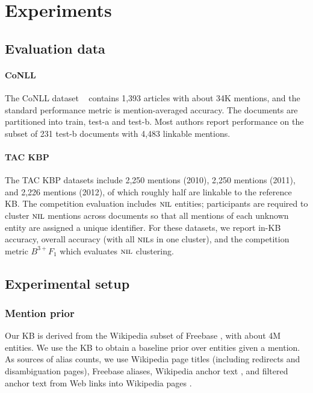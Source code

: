 \section{Experiments}
\label{sec:expt}

\subsection{Evaluation data}

\paragraph{CoNLL} 
The CoNLL dataset ~\cite{Hoffart2011} contains 1,393 articles with
about 34K mentions, and the standard performance metric is
mention-averaged accuracy.  The documents are partitioned into train,
test-a and test-b.  Most authors report performance on the subset of
231 test-b documents with 4,483 linkable mentions.

\paragraph{TAC KBP} 
The TAC KBP datasets \cite{TAC2010,TAC2011,TAC2012} include 2,250 mentions (2010),
2,250 mentions (2011), and 2,226 mentions (2012), 
of which roughly half are linkable
to the reference KB.  The competition evaluation includes $\mbox{\textsc{nil}}$
entities; participants are required to cluster $\mbox{\textsc{nil}}$ mentions across
documents so that all mentions of each unknown entity are assigned a
unique identifier.  For these datasets, we report in-KB accuracy,
overall accuracy (with all $\mbox{\textsc{nil}}$s in one cluster), and the competition
metric $B^{3+} F_1$ which evaluates $\mbox{\textsc{nil}}$ clustering.

\subsection{Experimental setup}

\subsubsection{Mention prior}

Our KB is derived from the Wikipedia subset of Freebase \cite{BollackerEPST08}, with about 4M entities. 
We use the KB to obtain a baseline prior over entities given a mention. As sources of alias counts, we use
Wikipedia page titles (including redirects and disambiguation pages), Freebase aliases, 
Wikipedia anchor text ,  and
 filtered anchor text from Web links into Wikipedia pages
\cite{singh12:wiki-links}.

